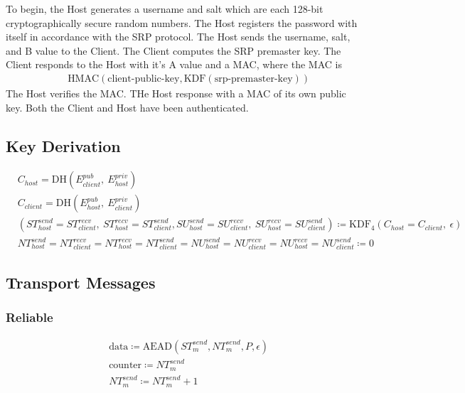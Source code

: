 \documentclass{article}
\begin{document}
    To begin, the Host generates a username and salt which are each 128-bit cryptographically secure random numbers.
    The Host registers the password with itself in accordance with the SRP protocol.
    The Host sends the username, salt, and B value to the Client.
    The Client computes the SRP premaster key.
    The Client responds to the Host with it's A value and a MAC, where the MAC is
    \begin{align*}
        & \text{HMAC}(\text{client-public-key}, \text{KDF}(\text{srp-premaster-key}))
    \end{align*}
    The Host verifies the MAC.
    THe Host response with a MAC of its own public key.
    Both the Client and Host have been authenticated.

    \subsection{Key Derivation}

    \begin{align*}
        & C_{host} = \text{DH}(E_{client}^{pub},\ E_{host}^{priv})\\
        & C_{client} = \text{DH}(E_{host}^{pub},\ E_{client}^{priv})\\
        & (\mathit{ST}_{host}^{send} = \mathit{ST}_{client}^{recv},\ \mathit{ST}_{host}^{recv} = \mathit{ST}_{client}^{send}, \mathit{SU}_{host}^{send} = \mathit{SU}_{client}^{recv},\ \mathit{SU}_{host}^{recv} = \mathit{SU}_{client}^{send}) \coloneqq \text{KDF}_4(C_{host} = C_{client},
        \ \epsilon) \\
        & \mathit{NT}_{host}^{send} = \mathit{NT}_{client}^{recv} = \mathit{NT}_{host}^{recv} = \mathit{NT}_{client}^{send} = \mathit{NU}_{host}^{send} = \mathit{NU}_{client}^{recv} = \mathit{NU}_{host}^{recv} = \mathit{NU}_{client}^{send} \coloneqq 0
    \end{align*}

    \subsection{Transport Messages}

    \subsubsection{Reliable}

    \begin{align*}
        & \text{data} \coloneqq \text{AEAD}(\mathit{ST}_{m}^{send},\mathit{NT}_{m}^{send}, P, \epsilon)\\
        & \text{counter} \coloneqq \mathit{NT}_{m}^{send}\\
        & \mathit{NT}_{m}^{send} \coloneqq \mathit{NT}_{m}^{send} + 1
    \end{align*}
\end{document}
